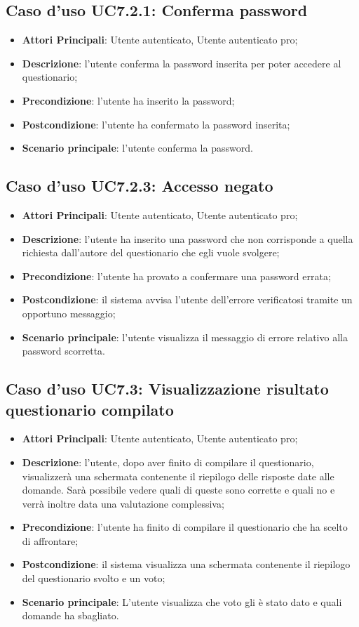 \subsection{Caso d'uso UC7.2.1: Conferma password}
\begin{itemize}
\item\textbf{Attori Principali}: Utente autenticato, Utente autenticato pro;
\item\textbf{Descrizione}: l'utente conferma la password inserita per poter accedere al questionario;
\item\textbf{Precondizione}: l'utente ha inserito la password;
\item\textbf{Postcondizione}: l'utente ha confermato la password inserita;
\item\textbf{Scenario principale}: l'utente conferma la password.
\end{itemize}

\subsection{Caso d'uso UC7.2.3: Accesso negato}
\begin{itemize}
\item\textbf{Attori Principali}: Utente autenticato, Utente autenticato pro;
\item\textbf{Descrizione}: l'utente ha inserito una password che non corrisponde a quella richiesta dall'autore del questionario che egli vuole svolgere;
\item\textbf{Precondizione}: l'utente ha provato a confermare una password errata;
\item\textbf{Postcondizione}: il sistema avvisa l'utente dell'errore verificatosi tramite un opportuno messaggio;
\item\textbf{Scenario principale}: l'utente visualizza il messaggio di errore relativo alla password scorretta.
\end{itemize}

\subsection{Caso d'uso UC7.3: Visualizzazione risultato questionario compilato}
\begin{itemize}
\item\textbf{Attori Principali}: Utente autenticato, Utente autenticato pro;
\item\textbf{Descrizione}: l'utente, dopo aver finito di compilare il questionario, visualizzerà una schermata contenente il riepilogo delle risposte date alle domande. Sarà possibile vedere quali di queste sono corrette e quali no e verrà inoltre data una valutazione complessiva;
\item\textbf{Precondizione}: l'utente ha finito di compilare il questionario che ha scelto di affrontare;
\item\textbf{Postcondizione}: il sistema visualizza una schermata contenente il riepilogo del questionario svolto e un voto;
\item\textbf{Scenario principale}: L'utente visualizza che voto gli è stato dato e quali domande ha sbagliato.
\end{itemize}
